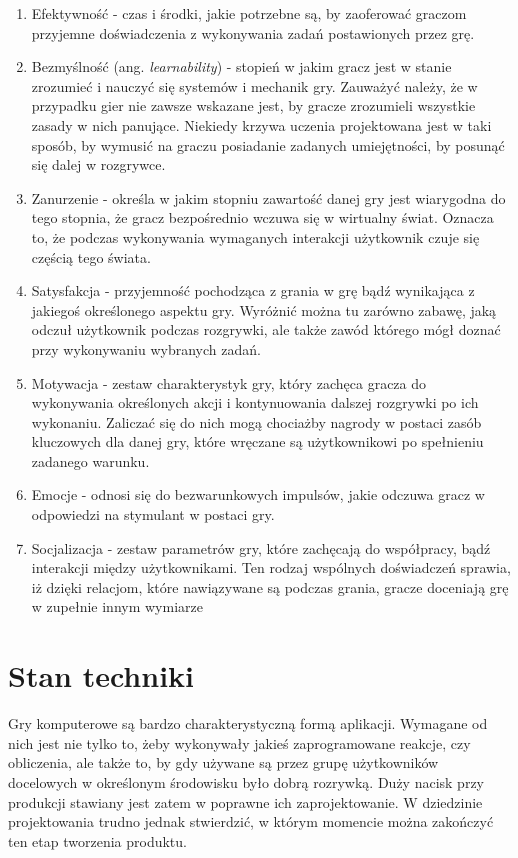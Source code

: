 \documentclass[a4paper,12pt,numbers=noenddot]{report}
\begin{document}
\begin{enumerate}
\item Efektywność - czas i środki, jakie potrzebne są, by zaoferować graczom przyjemne doświadczenia z wykonywania zadań postawionych przez grę.
\item Bezmyślność (ang. \textit{learnability}) - stopień w jakim gracz jest w stanie zrozumieć i nauczyć się systemów i mechanik gry. Zauważyć należy, że w przypadku gier nie zawsze wskazane jest, by gracze zrozumieli wszystkie zasady w nich panujące. Niekiedy krzywa uczenia projektowana jest w taki sposób, by wymusić na graczu posiadanie zadanych umiejętności, by posunąć się dalej w rozgrywce.
\item Zanurzenie - określa w jakim stopniu zawartość danej gry jest wiarygodna do tego stopnia, że gracz bezpośrednio wczuwa się w wirtualny świat. Oznacza to, że podczas wykonywania wymaganych interakcji użytkownik czuje się częścią tego świata.
\item Satysfakcja - przyjemność pochodząca z grania w grę bądź wynikająca z jakiegoś określonego aspektu gry. Wyróżnić można tu zarówno zabawę, jaką odczuł użytkownik podczas rozgrywki, ale także zawód którego mógł doznać przy wykonywaniu wybranych zadań.
\item Motywacja - zestaw charakterystyk gry, który zachęca gracza do wykonywania określonych akcji i kontynuowania dalszej rozgrywki po ich wykonaniu. Zaliczać się do nich mogą chociażby nagrody w postaci zasób kluczowych dla danej gry, które wręczane są użytkownikowi po spełnieniu zadanego warunku.
\item Emocje - odnosi się do bezwarunkowych impulsów, jakie odczuwa gracz w odpowiedzi na stymulant w postaci gry.
\item Socjalizacja - zestaw parametrów gry, które zachęcają do współpracy, bądź interakcji między użytkownikami. Ten rodzaj wspólnych doświadczeń sprawia, iż dzięki relacjom, które nawiązywane są podczas grania, gracze doceniają grę w zupełnie innym wymiarze 
\end{enumerate}


\chapter{Stan techniki}
Gry komputerowe są bardzo charakterystyczną formą aplikacji. Wymagane od nich jest nie tylko to, żeby wykonywały jakieś zaprogramowane reakcje, czy obliczenia, ale także to, by gdy używane są przez grupę użytkowników docelowych w określonym środowisku było dobrą rozrywką. Duży nacisk przy produkcji stawiany jest zatem w poprawne ich zaprojektowanie. W dziedzinie projektowania trudno jednak stwierdzić, w którym momencie można zakończyć ten etap tworzenia produktu. 
\end{document}
